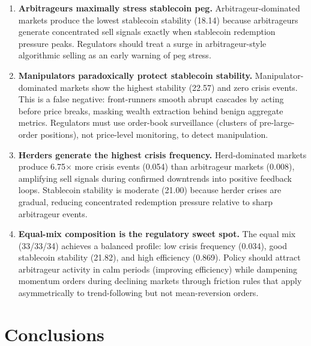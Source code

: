 \documentclass[11pt,a4paper]{article}
\begin{document}
\begin{enumerate}[leftmargin=*,nosep]
  \item \textbf{Arbitrageurs maximally stress stablecoin peg.}  Arbitrageur-dominated markets produce the lowest stablecoin stability (18.14) because arbitrageurs generate concentrated sell signals exactly when stablecoin redemption pressure peaks.  Regulators should treat a surge in arbitrageur-style algorithmic selling as an early warning of peg stress.

  \item \textbf{Manipulators paradoxically protect stablecoin stability.}  Manipulator-dominated markets show the highest stability (22.57) and zero crisis events.  This is a false negative: front-runners smooth abrupt cascades by acting before price breaks, masking wealth extraction behind benign aggregate metrics.  Regulators must use order-book surveillance (clusters of pre-large-order positions), not price-level monitoring, to detect manipulation.

  \item \textbf{Herders generate the highest crisis frequency.}  Herd-dominated markets produce 6.75$\times$ more crisis events (0.054) than arbitrageur markets (0.008), amplifying sell signals during confirmed downtrends into positive feedback loops.  Stablecoin stability is moderate (21.00) because herder crises are gradual, reducing concentrated redemption pressure relative to sharp arbitrageur events.

  \item \textbf{Equal-mix composition is the regulatory sweet spot.}  The equal mix (33/33/34) achieves a balanced profile: low crisis frequency (0.034), good stablecoin stability (21.82), and high efficiency (0.869).  Policy should attract arbitrageur activity in calm periods (improving efficiency) while dampening momentum orders during declining markets through friction rules that apply asymmetrically to trend-following but not mean-reversion orders.
\end{enumerate}

\section{Conclusions}
\end{document}
